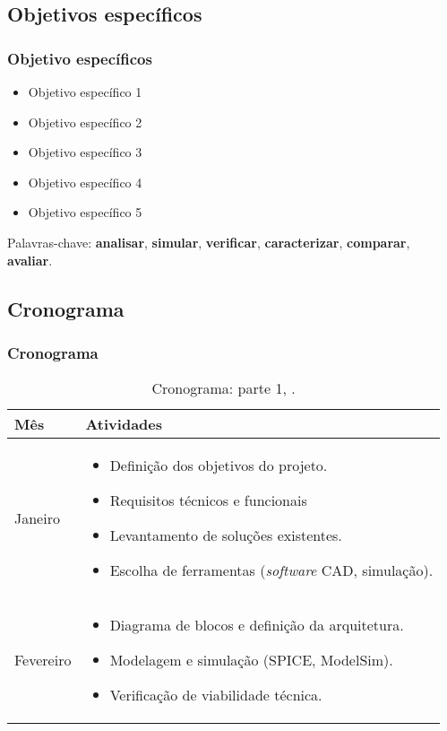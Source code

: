 \documentclass[hyperref={colorlinks=true,    
allcolors = blue,citecolor=blue}]{beamer} %
\begin{document}
\begin{frame}
\subsection{Objetivos específicos}
\frametitle{Objetivo específicos}

\begin{itemize}
    \item Objetivo específico 1
    \item Objetivo específico 2
    \item Objetivo específico 3
    \item Objetivo específico 4
    \item Objetivo específico 5    
\end{itemize}

Palavras-chave: \textbf{analisar}, \textbf{simular}, \textbf{verificar}, \textbf{caracterizar}, \textbf{comparar}, \textbf{avaliar}.

\end{frame}
\begin{frame}
\section{Cronograma}
\frametitle{Cronograma}


\begin{table}[!htp]
\centering
\begin{tabular}{ | m{1.5cm} | m{25em}| } 
  \hline
  Mês & Atividades \\ 
  \hline
  Janeiro & \begin{itemize}
    \item Definição dos objetivos do projeto.
    \item  Requisitos técnicos e funcionais
    \item  Levantamento de soluções existentes.
    \item Escolha de ferramentas (\textit{software} CAD, simulação).\end{itemize} \\  \hline
  Fevereiro  & \begin{itemize}      
\item Diagrama de blocos e definição da arquitetura.
\item Modelagem e simulação (SPICE, ModelSim).
\item Verificação de viabilidade técnica. 
  \end{itemize}  \\  \hline  
\end{tabular}
\caption{Cronograma: parte 1, \cite{nome_do_autor}.}
\label{tabela1}
\end{table}

\end{frame}
\end{document}
